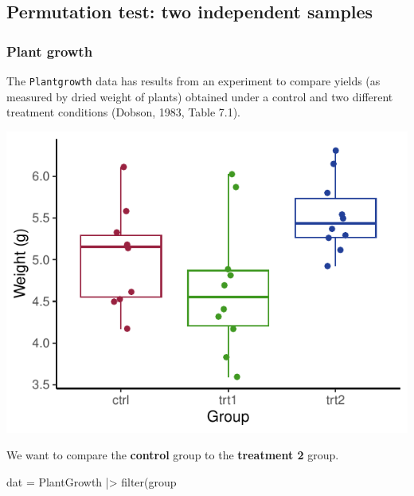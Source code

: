 \documentclass[a4paper]{article}\usepackage[]{graphicx}\usepackage[]{xcolor}
\makeatletter
\def\maxwidth{ %
  \ifdim\Gin@nat@width>\linewidth
    \linewidth
  \else
    \Gin@nat@width
  \fi
}
\makeatother
\begin{document}
\subsection{Permutation test: two independent samples}
\subsubsection{Plant growth}
The \lstinline|Plantgrowth| data has results from an experiment to compare yields (as measured by dried weight of plants) obtained under a control and two different treatment conditions (Dobson, 1983, Table 7.1).
\begin{Schunk}


{\centering \includegraphics[width=\maxwidth]{figure/listings-unnamed-chunk-137-1} 

}

\end{Schunk}
We want to compare the \textbf{control} group to the \textbf{treatment 2} group.
\begin{Schunk}
\begin{Sinput}
dat = PlantGrowth |> filter(group %
\end{Sinput}
\end{Schunk}
\end{document}
